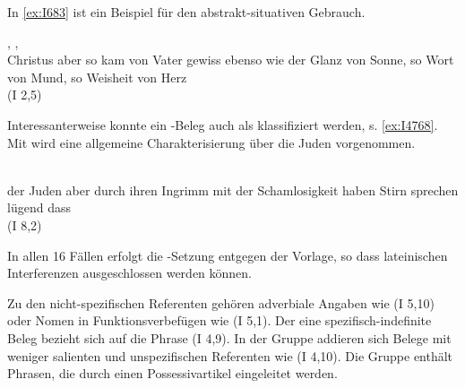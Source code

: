 In \ref{ex:I683} ist ein Beispiel für den abstrakt-situativen Gebrauch. 
%
\begin{exe}
\ex \label{ex:I683} \gll {}           ,    ,     \\
{Christus} {aber} {so} {kam} {von} {Vater} {gewiss} {ebenso wie} {der} {Glanz} {von} {Sonne}, {so} {Wort} {von} {Mund}, {so} {Weisheit} {von} {Herz} {}\\
\glt {} (I 2,5)
\end{exe}

Interessanterweise konnte ein -Beleg auch als  klassifiziert werden, s. \ref{ex:I4768}. Mit  wird eine allgemeine Charakterisierung über die Juden vorgenommen. 
%

\begin{exe}
\ex \label{ex:I4768} \gll {}             \\
{der} {Juden} {aber} {durch} {ihren} {Ingrimm} {mit} {der} {Schamlosigkeit} {haben} {Stirn} {sprechen} {lügend} {dass}\\
\glt {}(I 8,2)
\end{exe}

In allen 16 Fällen erfolgt die -Setzung entgegen der Vorlage, so dass lateinischen Interferenzen ausgeschlossen werden können.

Zu den nicht-spezifischen Referenten gehören adverbiale Angaben wie  (I 5,10) oder Nomen in Funktionsverbefügen wie   (I 5,1). Der eine spezifisch-indefinite Beleg bezieht sich auf die Phrase   (I 4,9). In der Gruppe  addieren sich Belege mit weniger salienten und unspezifischen Referenten wie   (I 4,10). Die Gruppe  enthält Phrasen, die durch einen Possessivartikel eingeleitet werden. 

